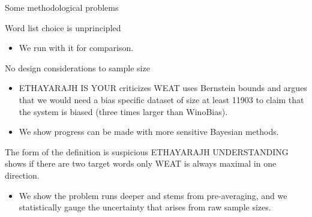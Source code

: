 \documentclass[
  10pt,
  ignorenonframetext,
  x11names, dvipsnames, bibspacing,natbib, table]{beamer}
\providecommand{\tightlist}{%
  \setlength{\itemsep}{0pt}\setlength{\parskip}{0pt}}
\begin{document}
\begin{frame}{Some methodological problems}
\protect\hypertarget{some-methodological-problems}{}
\begin{block}{Word list choice is unprincipled}
\protect\hypertarget{word-list-choice-is-unprincipled}{}
\begin{itemize}
\tightlist
\item
  We run with it for comparison.
\end{itemize}

\pause
\end{block}

\begin{block}{No design considerations to sample size}
\protect\hypertarget{no-design-considerations-to-sample-size}{}
\begin{itemize}
\tightlist
\item
  ETHAYARAJH IS YOUR criticizes WEAT uses Bernstein bounds and argues
  that we would need a bias specific dataset of size at least 11903 to
  claim that the system is biased (three times larger than WinoBias).
\end{itemize}

\pause

\begin{itemize}
\tightlist
\item
  We show progress can be made with more sensitive Bayesian methods.
\end{itemize}
\end{block}

\begin{block}{The form of the definition is suspicious}
\protect\hypertarget{the-form-of-the-definition-is-suspicious}{}
ETHAYARAJH UNDERSTANDING shows if there are two target words only WEAT
is always maximal in one direction.

\pause

\begin{itemize}
\tightlist
\item
  We show the problem runs deeper and stems from pre-averaging, and we
  statistically gauge the uncertainty that arises from raw sample sizes.
\end{itemize}
\end{block}
\end{frame}
\end{document}
